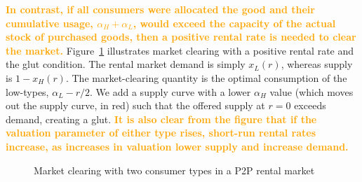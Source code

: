\documentclass[11pt]{article}
\newcommand{\important}[1]{\textcolor{orange}{\textbf{#1}}}
\newcommand{\important}[1]{#1}
\begin{document}
\important{In contrast, if all consumers were allocated the good and their cumulative usage, $\alpha_H + \alpha_L$, would exceed the capacity of the actual stock of purchased goods, then a positive rental rate is needed to clear the market.}
Figure~\ref{fig:market_clearing} illustrates market clearing with a positive rental rate and the glut condition. 
The rental market demand is simply $x_L(r)$, whereas supply is $1-x_H(r)$. 
The market-clearing quantity is the optimal consumption of the low-types, $\alpha_L - r/2$. 
We add a supply curve with a lower $\alpha_H$ value (which moves out the supply curve, in red) such that the offered supply at $r = 0$ exceeds demand, creating a glut.  
\important{It is also clear from the figure that if the valuation parameter of either type rises, short-run rental rates increase, as increases in valuation lower supply and increase demand.} 
 
\newcommand*{\alphaH}{0.80}%
\newcommand*{\alphaL}{0.50}%
\newcommand*{\alphaHp}{0.40}
\pgfmathsetmacro{\r}{-1 + \alphaH + \alphaL}%
\pgfmathsetmacro{\Q}{\alphaL - \r/2}
\begin{figure} 
\caption{Market clearing with two consumer types in a P2P rental market} 
\label{fig:market_clearing} 
\begin{center}
\end{center}
\end{figure} 
\end{document}
